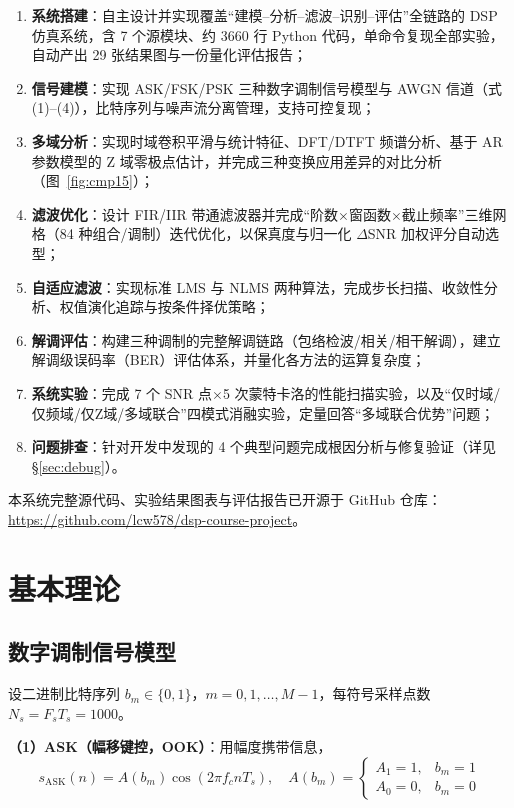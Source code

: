 \documentclass[12pt, a4paper, UTF8]{ctexart}
\begin{document}
\begin{enumerate}
  \item \textbf{系统搭建}：自主设计并实现覆盖``建模--分析--滤波--识别--评估''全链路的 DSP 仿真系统，含 7 个源模块、约 3660 行 Python 代码，单命令复现全部实验，自动产出 29 张结果图与一份量化评估报告；
  \item \textbf{信号建模}：实现 ASK/FSK/PSK 三种数字调制信号模型与 AWGN 信道（式(1)--(4)），比特序列与噪声流分离管理，支持可控复现；
  \item \textbf{多域分析}：实现时域卷积平滑与统计特征、DFT/DTFT 频谱分析、基于 AR 参数模型的 Z 域零极点估计，并完成三种变换应用差异的对比分析（图~\ref{fig:cmp15}）；
  \item \textbf{滤波优化}：设计 FIR/IIR 带通滤波器并完成``阶数$\times$窗函数$\times$截止频率''三维网格（84 种组合/调制）迭代优化，以保真度与归一化 $\Delta$SNR 加权评分自动选型；
  \item \textbf{自适应滤波}：实现标准 LMS 与 NLMS 两种算法，完成步长扫描、收敛性分析、权值演化追踪与按条件择优策略；
  \item \textbf{解调评估}：构建三种调制的完整解调链路（包络检波/相关/相干解调），建立解调级误码率（BER）评估体系，并量化各方法的运算复杂度；
  \item \textbf{系统实验}：完成 7 个 SNR 点$\times$5 次蒙特卡洛的性能扫描实验，以及``仅时域/仅频域/仅Z域/多域联合''四模式消融实验，定量回答``多域联合优势''问题；
  \item \textbf{问题排查}：针对开发中发现的 4 个典型问题完成根因分析与修复验证（详见 \S\ref{sec:debug}）。
\end{enumerate}

本系统完整源代码、实验结果图表与评估报告已开源于 GitHub 仓库：\url{https://github.com/lcw578/dsp-course-project}。

\section{基本理论}

\subsection{数字调制信号模型}

设二进制比特序列 $b_m \in \{0,1\}$，$m=0,1,\dots,M-1$，每符号采样点数 $N_s = F_s T_s = 1000$。

\textbf{（1）ASK（幅移键控，OOK）}：用幅度携带信息，
\begin{equation}
s_{\mathrm{ASK}}(n) = A(b_m)\cos(2\pi f_c n T_s), \quad A(b_m)=\begin{cases}A_1=1, & b_m=1\\ A_0=0, & b_m=0\end{cases}
\end{equation}
\end{document}
